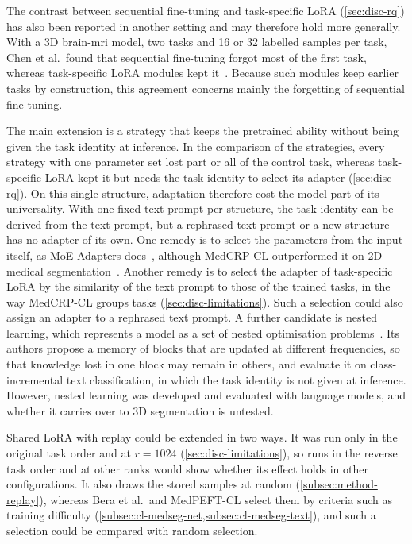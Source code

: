 The contrast between sequential fine-tuning and task-specific LoRA (\cref{sec:disc-rq}) has also been reported in another setting and may therefore hold more generally.
With a 3D brain-\gls{mri} model, two tasks and 16 or 32 labelled samples per task, Chen et al.\ found that sequential fine-tuning forgot most of the first task, whereas task-specific LoRA modules kept it~\cite{chen2026fewshotcontinuallearning3d}.
Because such modules keep earlier tasks by construction, this agreement concerns mainly the forgetting of sequential fine-tuning.

The main extension is a strategy that keeps the pretrained ability without being given the task identity at inference.
In the comparison of the strategies, every strategy with one parameter set lost part or all of the control task, whereas task-specific LoRA kept it but needs the task identity to select its adapter (\cref{sec:disc-rq}).
On this single structure, adaptation therefore cost the model part of its universality.
With one fixed text prompt per structure, the task identity can be derived from the text prompt, but a rephrased text prompt or a new structure has no adapter of its own.
One remedy is to select the parameters from the input itself, as MoE-Adapters does~\cite{yu2024boostingcontinuallearningvisionlanguage}, although MedCRP-CL outperformed it on 2D medical segmentation~\cite{gao2026medcrpcl}.
Another remedy is to select the adapter of task-specific LoRA by the similarity of the text prompt to those of the trained tasks, in the way MedCRP-CL groups tasks (\cref{sec:disc-limitations}).
Such a selection could also assign an adapter to a rephrased text prompt.
A further candidate is nested learning, which represents a model as a set of nested optimisation problems~\cite{behrouz2025nestedlearning}.
Its authors propose a memory of blocks that are updated at different frequencies, so that knowledge lost in one block may remain in others, and evaluate it on class-incremental text classification, in which the task identity is not given at inference.
However, nested learning was developed and evaluated with language models, and whether it carries over to 3D segmentation is untested.

Shared LoRA with replay could be extended in two ways.
It was run only in the original task order and at $r = 1024$ (\cref{sec:disc-limitations}), so runs in the reverse task order and at other ranks would show whether its effect holds in other configurations.
It also draws the stored samples at random (\cref{subsec:method-replay}), whereas Bera et al.\ and MedPEFT-CL select them by criteria such as training difficulty (\cref{subsec:cl-medseg-net,subsec:cl-medseg-text}), and such a selection could be compared with random selection.

